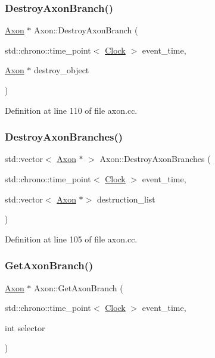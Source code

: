 \subsubsection{\texorpdfstring{Destroy\+Axon\+Branch()}{DestroyAxonBranch()}}
{\footnotesize\ttfamily \mbox{\hyperlink{class_axon}{Axon}} $\ast$ Axon\+::\+Destroy\+Axon\+Branch (\begin{DoxyParamCaption}\item[{std\+::chrono\+::time\+\_\+point$<$ \mbox{\hyperlink{universe_8h_a0ef8d951d1ca5ab3cfaf7ab4c7a6fd80}{Clock}} $>$}]{event\+\_\+time,  }\item[{\mbox{\hyperlink{class_axon}{Axon}} $\ast$}]{destroy\+\_\+object }\end{DoxyParamCaption})}



Definition at line 110 of file axon.\+cc.

\mbox{\label{class_axon_aa9d26eed8d178527d1995adfad2f67ac}} 
\subsubsection{\texorpdfstring{Destroy\+Axon\+Branches()}{DestroyAxonBranches()}}
{\footnotesize\ttfamily std\+::vector$<$ \mbox{\hyperlink{class_axon}{Axon}} $\ast$ $>$ Axon\+::\+Destroy\+Axon\+Branches (\begin{DoxyParamCaption}\item[{std\+::chrono\+::time\+\_\+point$<$ \mbox{\hyperlink{universe_8h_a0ef8d951d1ca5ab3cfaf7ab4c7a6fd80}{Clock}} $>$}]{event\+\_\+time,  }\item[{std\+::vector$<$ \mbox{\hyperlink{class_axon}{Axon}} $\ast$$>$}]{destruction\+\_\+list }\end{DoxyParamCaption})}



Definition at line 105 of file axon.\+cc.

\mbox{\label{class_axon_a723b00504169712e47f7437111ad4ae3}} 
\subsubsection{\texorpdfstring{Get\+Axon\+Branch()}{GetAxonBranch()}}
{\footnotesize\ttfamily \mbox{\hyperlink{class_axon}{Axon}} $\ast$ Axon\+::\+Get\+Axon\+Branch (\begin{DoxyParamCaption}\item[{std\+::chrono\+::time\+\_\+point$<$ \mbox{\hyperlink{universe_8h_a0ef8d951d1ca5ab3cfaf7ab4c7a6fd80}{Clock}} $>$}]{event\+\_\+time,  }\item[{int}]{selector }\end{DoxyParamCaption})}



